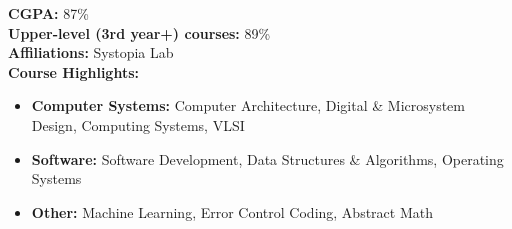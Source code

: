 \documentclass[10pt,a4paper,ragged2e,withhyper]{altacv}
\begin{document}
\begin{paracol}{2}












\textbf{CGPA:} 87\% \\
\textbf{Upper-level (3rd year+) courses:} 89\% \\
\textbf{Affiliations:} Systopia Lab \\

\textbf{Course Highlights:}
\begin{itemize}
  \item \textbf{Computer Systems:} Computer Architecture, Digital \& Microsystem Design, Computing Systems, VLSI
  \item \textbf{Software:} Software Development, Data Structures \& Algorithms, Operating Systems
  \item \textbf{Other:} Machine Learning, Error Control Coding, Abstract Math
\end{itemize}






\end{paracol}
\end{document}
